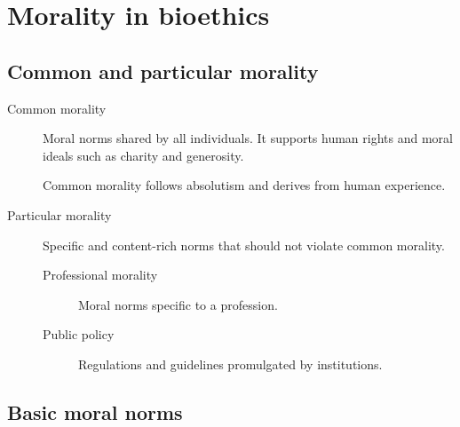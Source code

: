 \section{Morality in bioethics}


\subsection{Common and particular morality}

\begin{description}
    \item[Common morality] 
        Moral norms shared by all individuals. It supports human rights and moral ideals such as charity and generosity.

        \begin{remark}
            Common morality follows absolutism and derives from human experience.
        \end{remark}

    \item[Particular morality] 
        Specific and content-rich norms that should not violate common morality.

        \begin{description}
            \item[Professional morality] 
                Moral norms specific to a profession.

            \item[Public policy] 
                Regulations and guidelines promulgated by institutions.
        \end{description}
\end{description}


\subsection{Basic moral norms}

